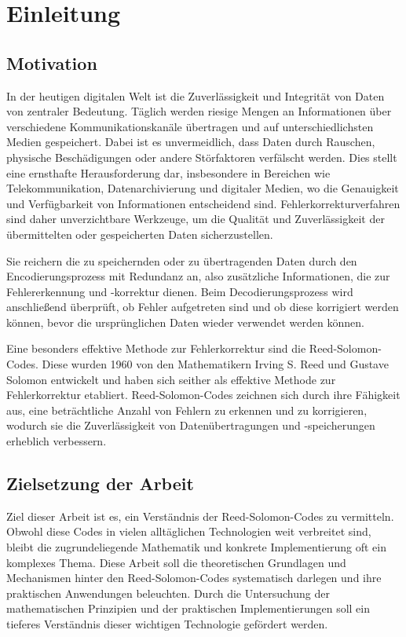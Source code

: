 \chapter{Einleitung}\label{ch:intro}

\section{Motivation}\label{sec:motivation}

In der heutigen digitalen Welt ist die Zuverlässigkeit und Integrität von Daten von zentraler Bedeutung. 
Täglich werden riesige Mengen an Informationen über verschiedene Kommunikationskanäle übertragen und auf unterschiedlichsten Medien gespeichert. 
Dabei ist es unvermeidlich, dass Daten durch Rauschen, physische Beschädigungen oder andere Störfaktoren verfälscht werden. 
Dies stellt eine ernsthafte Herausforderung dar, insbesondere in Bereichen wie Telekommunikation, Datenarchivierung und digitaler Medien, wo die Genauigkeit und Verfügbarkeit von Informationen entscheidend sind.
Fehlerkorrekturverfahren sind daher unverzichtbare Werkzeuge, um die Qualität und Zuverlässigkeit der übermittelten oder gespeicherten Daten sicherzustellen.

Sie reichern die zu speichernden oder zu übertragenden Daten durch den Encodierungsprozess mit Redundanz an, also zusätzliche Informationen, die zur Fehlererkennung und -korrektur dienen. Beim Decodierungsprozess wird anschließend überprüft, ob Fehler aufgetreten sind und ob diese korrigiert werden können, bevor die ursprünglichen Daten wieder verwendet werden können.

Eine besonders effektive Methode zur Fehlerkorrektur sind die Reed-Solomon-Codes.
Diese wurden 1960 von den Mathematikern Irving S. Reed und Gustave Solomon entwickelt und haben sich seither als effektive Methode zur Fehlerkorrektur etabliert. 
Reed-Solomon-Codes zeichnen sich durch ihre Fähigkeit aus, eine beträchtliche Anzahl von Fehlern zu erkennen und zu korrigieren, wodurch sie die Zuverlässigkeit von Datenübertragungen und -speicherungen erheblich verbessern.

\section{Zielsetzung der Arbeit}\label{sec:objective}

Ziel dieser Arbeit ist es, ein Verständnis der Reed-Solomon-Codes zu vermitteln. 
Obwohl diese Codes in vielen alltäglichen Technologien weit verbreitet sind, bleibt die zugrundeliegende Mathematik und konkrete Implementierung oft ein komplexes Thema. 
Diese Arbeit soll die theoretischen Grundlagen und Mechanismen hinter den Reed-Solomon-Codes systematisch darlegen und ihre praktischen Anwendungen beleuchten. 
Durch die Untersuchung der mathematischen Prinzipien und der praktischen Implementierungen soll ein tieferes Verständnis dieser wichtigen Technologie gefördert werden.

